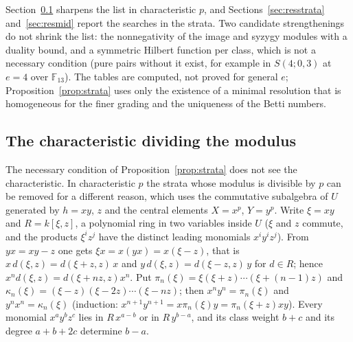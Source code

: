 \documentclass[11pt]{article}
\theoremstyle{definition}
\theoremstyle{remark}
\newcommand{\F}{\mathbb{F}}
\begin{document}
Section~\ref{sec:pdivm} sharpens the list in characteristic $p$, and Sections~\ref{sec:resstrata} and~\ref{sec:resmid} report the searches in the strata. Two candidate strengthenings do not shrink the list: the nonnegativity of the image and syzygy modules with a duality bound, and a symmetric Hilbert function per class, which is not a necessary condition (pure pairs without it exist, for example in $S(4;0,3)$ at $e=4$ over $\F_{13}$). The tables are computed, not proved for general $e$; Proposition~\ref{prop:strata} uses only the existence of a minimal resolution that is homogeneous for the finer grading and the uniqueness of the Betti numbers.

\subsection{The characteristic dividing the modulus}
\label{sec:pdivm}

The necessary condition of Proposition~\ref{prop:strata} does not see the characteristic. In characteristic $p$ the strata whose modulus is divisible by $p$ can be removed for a different reason, which uses the commutative subalgebra of $U$ generated by $h=xy$, $z$ and the central elements $X=x^p$, $Y=y^p$. Write $\xi=xy$ and $R=k[\xi,z]$, a polynomial ring in two variables inside $U$ ($\xi$ and $z$ commute, and the products $\xi^iz^j$ have the distinct leading monomials $x^iy^iz^j$). From $yx=xy-z$ one gets $\xi x=x(yx)=x(\xi-z)$, that is $x\,d(\xi,z)=d(\xi+z,z)\,x$ and $y\,d(\xi,z)=d(\xi-z,z)\,y$ for $d\in R$; hence $x^nd(\xi,z)=d(\xi+nz,z)x^n$. Put $\pi_n(\xi)=\xi(\xi+z)\cdots(\xi+(n-1)z)$ and $\kappa_n(\xi)=(\xi-z)(\xi-2z)\cdots(\xi-nz)$; then $x^ny^n=\pi_n(\xi)$ and $y^nx^n=\kappa_n(\xi)$ (induction: $x^{n+1}y^{n+1}=x\pi_n(\xi)y=\pi_n(\xi+z)xy$). Every monomial $x^ay^bz^c$ lies in $R\,x^{a-b}$ or in $R\,y^{b-a}$, and its class weight $b+c$ and its degree $a+b+2c$ determine $b-a$.
\end{document}
